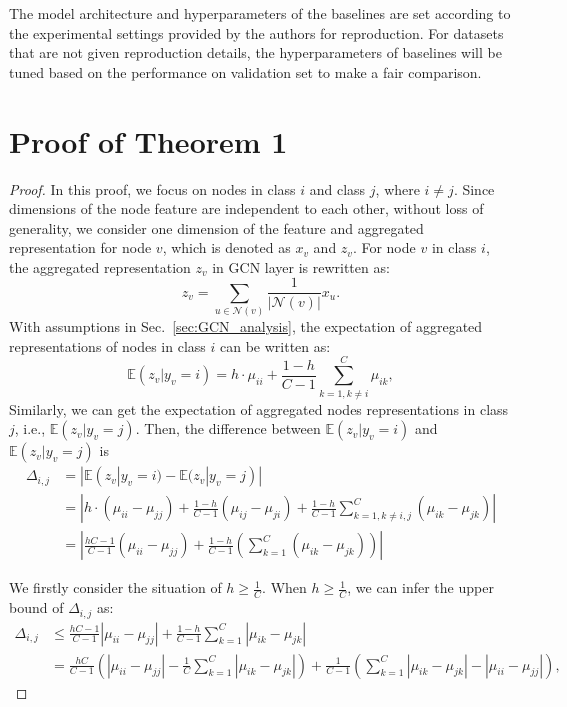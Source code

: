 The model architecture and hyperparameters of the baselines are set according to the experimental settings provided by the authors for reproduction. For datasets that are not given reproduction details, the hyperparameters of baselines will be tuned based on the performance on validation set to make a fair comparison.

\section{Proof of Theorem 1}
\label{app:theorem1}
\begin{proof}
In this proof, we focus on nodes in class $i$ and class $j$, where $i \neq j$.
Since dimensions of the node feature are independent to each other, without loss of generality, we consider one dimension of the feature and aggregated representation for node $v$, which is denoted as $x_v$ and $z_v$.
For node $v$ in class $i$, the aggregated representation ${z}_{v}$ in GCN layer is rewritten as: 
\begin{equation}
    {z}_{v} = \sum_{u\in \mathcal{N}(v)}\frac{1}{|\mathcal{N}(v)|}{x}_u.
    \label{eq:agg}
\end{equation}   
With assumptions in Sec.~\ref{sec:GCN_analysis}, the expectation of aggregated representations of nodes in class $i$ can be written as:
\begin{equation}
    \mathbb{E}({z}_{v}|y_v=i) = h \cdot {\mu}_{ii} + \frac{1-h}{C-1} \sum_{k=1,k \neq i}^{C} {\mu}_{ik},
\end{equation}
Similarly, we can get the expectation of aggregated nodes representations in class $j$, i.e., $\mathbb{E}({z}_{v}|y_v=j)$. Then, the difference between $\mathbb{E}({z}_{v}|y_v=i)$ and $\mathbb{E}({z}_{v}|y_v=j)$ is 
\begin{equation}
    \begin{aligned}
    \Delta_{i,j} & =  |\mathbb{E}({z}_{v}|y_v=i)-\mathbb{E}({z}_{v}|y_v=j)| \\
    & = |h\cdot ({\mu}_{ii}-{\mu}_{jj}) + \frac{1-h}{C-1}(\mu_{ij}-\mu_{ji}) + \frac{1-h}{C-1}\sum_{k=1,k \neq i,j} ^C(\mu_{ik}-\mu_{jk})|  \\
    & = |\frac{hC-1}{C-1} (\mu_{ii}-{\mu}_{jj}) + \frac{1-h}{C-1}(\sum_{k=1}^C(\mu_{ik}-\mu_{jk}))| 
    \end{aligned}
\label{eq:expect_differ}
\end{equation}

We firstly consider the situation of $h \geq \frac{1}{C}$. When $h \geq \frac{1}{C}$, we can infer the upper bound of $\Delta_{i,j}$ as:
\begin{equation}
\begin{aligned}
    \Delta_{i,j} & \leq \frac{hC-1}{C-1} |\mu_{ii}-\mu_{jj}|+\frac{1-h}{C-1}\sum_{k=1}^C|\mu_{ik}-\mu_{jk}| \\
    & = \frac{hC}{C-1}(|\mu_{ii} - \mu_{jj}|-\frac{1}{C}\sum_{k=1}^C|\mu_{ik}-\mu_{jk}|) +\frac{1}{C-1}(\sum_{k=1}^C|\mu_{ik}-\mu_{jk}|-|\mu_{ii} - \mu_{jj}|),
\end{aligned}
\label{eq:differ}
\end{equation}


\end{proof}

